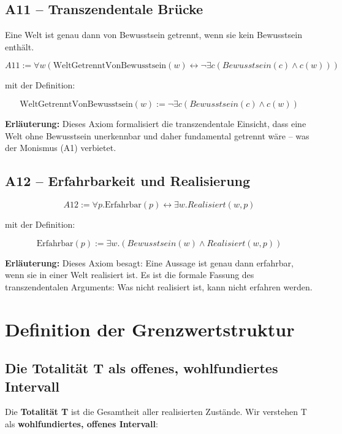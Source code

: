 \documentclass[
]{article}
\begin{document}
\subsection{A11 – Transzendentale Brücke}\label{a11-transzendentale-bruecke}

Eine Welt ist genau dann von Bewusstsein getrennt, wenn sie kein Bewusstsein enthält.

\[
\boxed{A11 := \forall w \left( \text{WeltGetrenntVonBewusstsein}(w) \leftrightarrow \neg \exists c (Bewusstsein(c) \land c(w)) \right)}
\]

mit der Definition:

\[
\boxed{\text{WeltGetrenntVonBewusstsein}(w) := \neg \exists c (Bewusstsein(c) \land c(w))}
\]

\textbf{Erläuterung:} Dieses Axiom formalisiert die transzendentale Einsicht, dass eine Welt ohne Bewusstsein unerkennbar und daher fundamental getrennt wäre – was der Monismus (A1) verbietet.

\subsection{A12 – Erfahrbarkeit und Realisierung}\label{a12-erfahrbarkeit-und-realisierung}

\[
\boxed{A12 := \forall p. \text{Erfahrbar}(p) \leftrightarrow \exists w. Realisiert(w, p)}
\]

mit der Definition:

\[
\boxed{\text{Erfahrbar}(p) := \exists w. (Bewusstsein(w) \land Realisiert(w, p))}
\]

\textbf{Erläuterung:} Dieses Axiom besagt: Eine Aussage ist genau dann erfahrbar, wenn sie in einer Welt realisiert ist. Es ist die formale Fassung des transzendentalen Arguments: Was nicht realisiert ist, kann nicht erfahren werden.

\section{Definition der Grenzwertstruktur}\label{definition-der-grenzwertstruktur}

\subsection{Die Totalität T als offenes, wohlfundiertes Intervall}\label{die-totalituxe4t-t-als-offenes-wohlfundiertes-intervall}

Die \textbf{Totalität T} ist die Gesamtheit aller realisierten Zustände. Wir verstehen T als \textbf{wohlfundiertes, offenes Intervall}:
\end{document}
